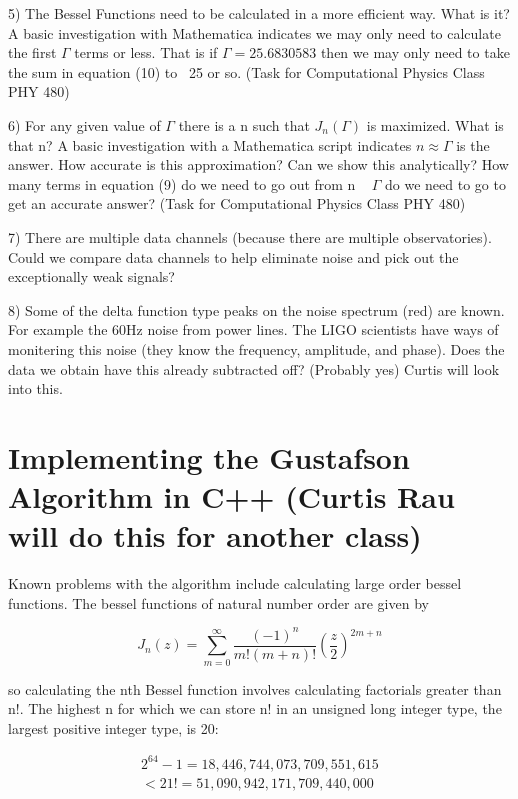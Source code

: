 \documentclass[twocolumn, groupedaddress]{revtex4-1}
\begin{document}
5) The Bessel Functions need to be calculated in a more efficient way.  What is it?  A basic investigation with Mathematica indicates we may only need to calculate the first $\Gamma$ terms or less.  That is if $\Gamma = 25.6830583$ then we may only need to take the sum in equation (10) to ~25 or so. (Task for Computational Physics Class PHY 480)

6) For any given value of $\Gamma$ there is a n such that $J_n(\Gamma)$ is maximized.  What is that n?  A basic investigation with a Mathematica script indicates $n \approx \Gamma$ is the answer.  How accurate is this approximation?  Can we show this analytically?  How many terms in equation (9) do we need to go out from n ~ $\Gamma$ do we need to go to get an accurate answer? (Task for Computational Physics Class PHY 480)

7) There are multiple data channels (because there are multiple observatories).  Could we compare data channels to help eliminate noise and pick out the exceptionally weak signals?

8) Some of the delta function type peaks on the noise spectrum (red) are known.  For example the 60Hz noise from power lines.  The LIGO scientists have ways of monitering this noise (they know the frequency, amplitude, and phase).  Does the data we obtain have this already subtracted off?  (Probably yes)  Curtis will look into this.

\section{Implementing the Gustafson Algorithm in C++ (Curtis Rau will do this for another class)}
Known problems with the algorithm include calculating large order bessel functions.  The bessel functions of natural number order are given by

\begin{equation}
J_n(z) = \sum_{m=0}^{\infty} \frac{(-1)^n}{m!(m+n)!} \left( \frac{z}{2} \right)^{2m+n}
\end{equation}

so calculating the nth Bessel function involves calculating factorials greater than n!.  The highest n for which we can store n! in an unsigned long integer type, the largest positive integer type, is 20:

\begin{align}
2^{64}-1 = 18,446,744,073,709,551,615 \\
< 21! = 51,090,942,171,709,440,000
\end{align}
\end{document}
